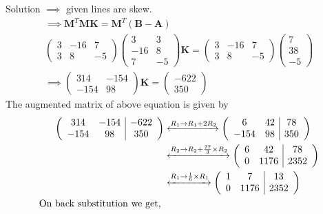 \documentclass{beamer}
\numberwithin{equation}{section}
\providecommand{\brak}[1]{\ensuremath{\left(#1\right)}}
\theoremstyle{remark}
\newcommand{\myvec}[1]{\ensuremath{\begin{pmatrix}#1\end{pmatrix}}}
\let\vec\mathbf
\begin{document}
\begin{frame}{Solution}
$\implies$ given lines are skew.
\begin{align}
\implies \vec{M}^T\vec{M}\vec{K}=\vec{M}^T\brak{\vec{B}-\vec{A}}\\
    \begin{pmatrix}
        3 & -16 & 7\\
        3 & 8 & -5
    \end{pmatrix}\begin{pmatrix}
    3 & 3\\
    -16 & 8\\
    7 & -5
        \end{pmatrix}\vec{K}=\begin{pmatrix}
        3 & -16 & 7\\
        3 & 8 & -5
    \end{pmatrix}\myvec{7\\38\\-5}\\
    \implies \begin{pmatrix}
        314 & -154\\
        -154 & 98
    \end{pmatrix}\vec{K}=\myvec{-622\\350}
\end{align}
The augmented matrix of above equation is given by
\begin{align}
    \left(\begin{array}{cc|c}
        314 & -154 & -622 \\
        -154 & 98 & 350 
\end{array}\right) &\xleftrightarrow{R_1 \rightarrow R_1+ 2R_2} \left(\begin{array}{cc|c}
        6 & 42 & 78 \\
        -154 & 98 & 350 
\end{array}\right)\\ &\xleftrightarrow{R_2 \rightarrow R_2+ \frac{77}{3}\times R_2} \left(\begin{array}{cc|c}
        6 & 42 & 78 \\
        0 & 1176 & 2352 
\end{array}\right)\\
&\xleftrightarrow{R_1 \rightarrow \frac{1}{6}\times R_1} \left(\begin{array}{cc|c}
        1 & 7 & 13 \\
        0 & 1176 & 2352 
\end{array}\right)\\
\text{On back substitution we get, } 
\end{align}
\end{frame}
\end{document}
